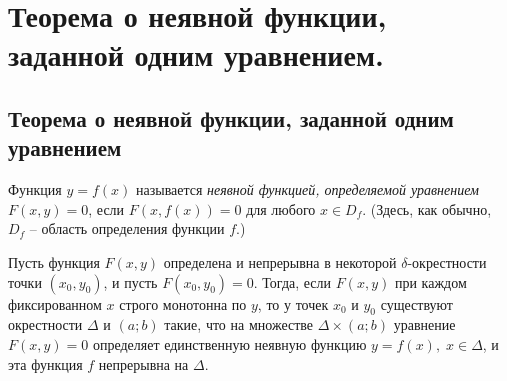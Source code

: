 \chapter{Теорема о неявной функции, заданной одним уравнением.}
\section{Теорема о неявной функции, заданной одним уравнением}
\begin{defn}
Функция $y=f(x)$ называется \textit{неявной функцией, определяемой уравнением} $F(x,y)=0$, если $F(x,f(x))=0$ для любого $x\in D_f$. (Здесь, как обычно, $D_f$ -- область определения функции $f$.)
\end{defn}

\begin{thm}\label{yaa14th1}
Пусть функция $F(x,y)$ определена и непрерывна в некоторой $\delta$-окрестности точки $(x_0,y_0)$, и пусть $F(x_0,y_0)=0$. Тогда, если $F(x,y)$ при каждом фиксированном $x$ строго монотонна по $y$, то у точек $x_0$ и $y_0$ существуют окрестности $\Delta$ и $(a;b)$ такие, что на множестве $\Delta\times(a;b)$ уравнение $F(x,y)=0$ определяет единственную неявную функцию $y=f(x),\; x\in\Delta$, и эта функция  $f$ непрерывна на $\Delta$. 
\end{thm}

